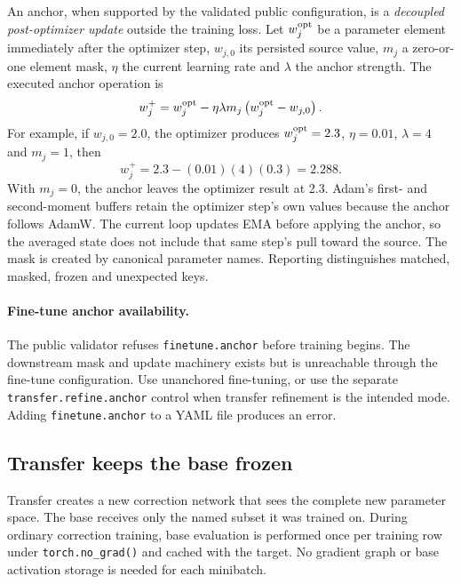 \documentclass[10pt,aps,prd,twocolumn,nofootinbib]{revtex4-2}
\newcommand{\code}[1]{\texttt{#1}}
\begin{document}
An anchor, when supported by the validated public configuration, is a
\emph{decoupled post-optimizer update} outside the training loss.  Let
$w_j^{\rm opt}$ be a parameter element immediately
after the optimizer step, $w_{j,0}$ its persisted source value, $m_j$ a
zero-or-one element mask, $\eta$ the current learning rate and $\lambda$ the
anchor strength.  The executed anchor operation is
\begin{equation*}
 w_j^{+}=w_j^{\rm opt}
 -\eta\lambda m_j
  \left(w_j^{\rm opt}-w_{j,0}\right).
\end{equation*}
For example, if $w_{j,0}=2.0$, the optimizer produces
$w_j^{\rm opt}=2.3$, $\eta=0.01$, $\lambda=4$ and $m_j=1$, then
\begin{equation*}
 w_j^{+}=2.3-(0.01)(4)(0.3)=2.288.
\end{equation*}
With $m_j=0$, the anchor leaves the optimizer result at 2.3.  Adam's first-
and second-moment buffers retain the optimizer step's own values because the
anchor follows AdamW.  The current loop updates EMA before applying the anchor,
so the averaged state does not include that same step's pull toward the source.
The mask is created by canonical parameter names.  Reporting distinguishes
matched, masked, frozen and unexpected keys.

\paragraph{Fine-tune anchor availability.}
The public validator refuses \code{finetune.anchor} before training begins.
The downstream mask and update machinery exists but is unreachable through
the fine-tune configuration.  Use unanchored fine-tuning, or use the separate
\code{transfer.refine.anchor} control when transfer refinement is the intended
mode.  Adding \code{finetune.anchor} to a YAML file produces an error.

\subsection{Transfer keeps the base frozen}

Transfer creates a new correction network that sees the complete new
parameter space.  The base receives only the named subset it was trained on.
During ordinary correction training, base evaluation is performed once per
training row under \code{torch.no\_grad()} and cached with the target.  No
gradient graph or base activation storage is needed for each minibatch.
\end{document}
